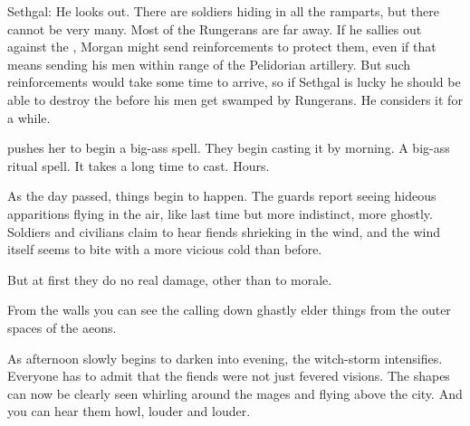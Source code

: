 Sethgal:
He looks out. 
There are soldiers hiding in all the ramparts, but there cannot be very many.
Most of the Rungerans are far away.
If he sallies out against the \ishrah, Morgan might send reinforcements to protect them, even if that means sending his men within range of the Pelidorian artillery. 
But such reinforcements would take some time to arrive, so if Sethgal is lucky he should be able to destroy the \ishrah before his men get swamped by Rungerans. 
He considers it for a while. 




\begin{comment}
  \subsection{Witch-storms}
\end{comment}
\new
\Takestsha pushes her \ishrah to begin a big-ass spell. 
They begin casting it by morning. 
A big-ass ritual spell. 
It takes a long time to cast. 
Hours. 

As the day passed, things begin to happen. 
The guards report seeing hideous apparitions flying in the air, like last time but more indistinct, more ghostly. 
Soldiers and civilians claim to hear fiends shrieking in the wind, and the wind itself seems to bite with a more vicious cold than before. 

But at first they do no real damage, other than to morale.

From the walls you can see the \ishrah calling down ghastly elder things from the outer spaces of the aeons.

As afternoon slowly begins to darken into evening, the witch-storm intensifies. 
Everyone has to admit that the fiends were not just fevered visions.
The shapes can now be clearly seen whirling around the mages and flying above the city. 
And you can hear them howl, louder and louder. 

